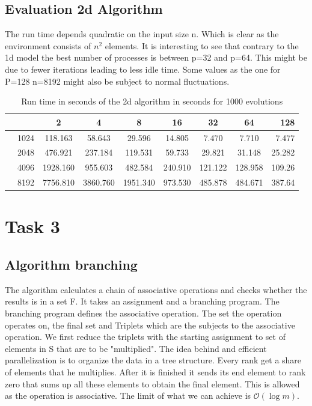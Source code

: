 \documentclass[11pt]{article} %
\begin{document}
\subsection{Evaluation 2d Algorithm}
The run time depends quadratic on the input size n. Which is clear as the environment consists of
$n^2$ elements. It is interesting to see that contrary to the 1d model the best number of processes
is between p=32 and p=64. This might be due to fewer iterations leading to less idle time. Some
values as the one for P=128 n=8192 might also be subject to normal fluctuations.

\begin{table}
\begin{center}
\begin{tabular}{l c|c|c|c|c|c|c|r|}
\hline
 &       & 2       & 4       & 8       & 16      & 32      & 64      & 128     \\
\hline
&1024    &118.163 &58.643  &29.596  &14.805  &7.470   &7.710   &7.477\\
\hline
&2048   &476.921 &237.184 &119.531 &59.733  &29.821  &31.148  &25.282 \\
\hline
&4096   &1928.160 &955.603 &482.584 &240.910 &121.122 &128.958 &109.26 \\
\hline
&8192   &7756.810 &3860.760 &1951.340 &973.530 &485.878 &484.671 &387.64 \\
\hline
\end{tabular}
\caption{Run time in seconds of the 2d algorithm in seconds for 1000 evolutions}
\end{center}
\end{table}

\section{Task 3}
\subsection{Algorithm branching}
The algorithm calculates a chain of associative operations and checks whether the results is in a set
F.
It takes an assignment and a branching program. The branching program defines the associative
operation. The set the operation operates on, the final set and Triplets which are the subjects to
the associative operation. We first reduce the triplets with the starting assignment to set of
elements in S that are to be "multiplied".
The idea behind and efficient parallelization is to organize the data in a
tree structure. Every rank get a share of elements that he multiplies. After it is finished it sends
its end element to rank zero that sums up all these elements to obtain the final element. 
This is allowed as the operation is associative. The limit of what we can achieve is
$\mathcal{O}(\log{m})$. 
\end{document}
